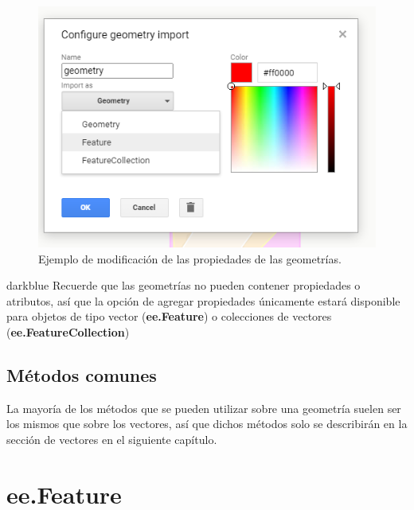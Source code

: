 \documentclass[
  12pt,
  letterpaper,
  twoside]{book}
\newcommand\boldpurple[1]{\textcolor{darkpurple}{\textbf{#1}}}
\begin{document}
\begin{figure}[H]

{\centering \includegraphics[width=0.95\linewidth]{Img/menuGeo} 

}

\caption{Ejemplo de modificación de las propiedades de las geometrías.}\label{fig:f67}
\end{figure}

\begin{bluebox2}

\begin{awesomeblock}{5pt}{\faLightbulb}{darkblue}
Recuerde que las geometrías no pueden contener propiedades o atributos, así que la opción de agregar propiedades únicamente estará disponible para objetos de tipo vector (\boldpurple{ee.Feature}) o colecciones de vectores (\boldpurple{ee.FeatureCollection})

\end{awesomeblock}

\end{bluebox2}

\hypertarget{muxe9todos-comunes}{%
\section{Métodos comunes}\label{muxe9todos-comunes}}

La mayoría de los métodos que se pueden utilizar sobre una geometría suelen ser los mismos que sobre los vectores, así que dichos métodos solo se describirán en la sección de vectores en el siguiente capítulo.

\newpage

\hypertarget{ee.feature-1}{%
\chapter{ee.Feature}\label{ee.feature-1}}
\end{document}
